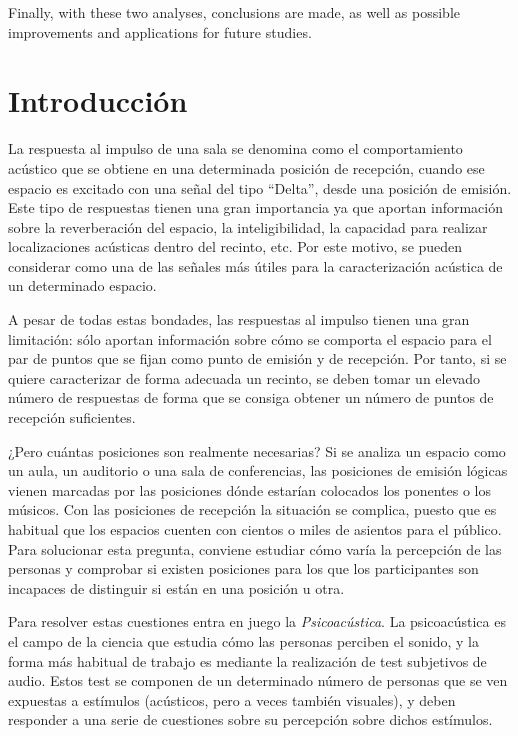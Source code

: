 \documentclass[11pt,a4paper]{book}
\begin{document}
    Finally, with these two analyses, conclusions are made, as well as possible improvements and applications for future studies.

\tableofcontents
\listoffigures
\listoftables
\chapter{Introducción}
    La respuesta al impulso de una sala se denomina como el comportamiento acústico que se obtiene en una determinada posición de recepción, cuando ese espacio es excitado con una señal del tipo ``Delta'', desde una posición de emisión. Este tipo de respuestas tienen una gran importancia ya que aportan información sobre la reverberación del espacio, la inteligibilidad, la capacidad para realizar localizaciones acústicas dentro del recinto, etc. Por este motivo, se pueden considerar como una de las señales más útiles para la caracterización acústica de un determinado espacio. 
    
    A pesar de todas estas bondades, las respuestas al impulso tienen una gran limitación: sólo aportan información sobre cómo se comporta el espacio para el par de puntos que se fijan como punto de emisión y de recepción. Por tanto, si se quiere caracterizar de forma adecuada un recinto, se deben tomar un elevado número de respuestas de forma que se consiga obtener un número de puntos de recepción suficientes.
    
    ¿Pero cuántas posiciones son realmente necesarias? Si se analiza un espacio como un aula, un auditorio o una sala de conferencias, las posiciones de emisión lógicas vienen marcadas por las posiciones dónde estarían colocados los ponentes o los músicos. Con las posiciones de recepción la situación se complica, puesto que es habitual que los espacios cuenten con cientos o miles de asientos para el público. Para solucionar esta pregunta, conviene estudiar cómo varía la percepción de las personas y comprobar si existen posiciones para los que los participantes son incapaces de distinguir si están en una posición u otra.
    
    Para resolver estas cuestiones entra en juego la \textit{Psicoacústica}. La psicoacústica es el campo de la ciencia que estudia cómo las personas perciben el sonido, y la forma más habitual de trabajo es mediante la realización de test subjetivos de audio. Estos test se componen de un determinado número de personas que se ven expuestas a estímulos (acústicos, pero a veces también visuales), y deben responder a una serie de cuestiones sobre su percepción sobre dichos estímulos.
    
\end{document}

